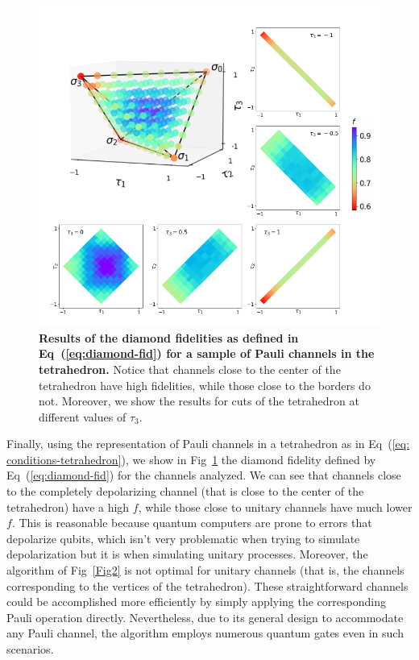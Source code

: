 \documentclass[10pt,letterpaper]{article} %
\newcommand{\fref}[1]{Fig~\ref{#1}}
\newcommand{\eref}[1]{Eq~(\ref{#1})}
\begin{document}
\begin{figure} %
\centering
\includegraphics{images/fig-tetra.pdf}
\caption{{\bf Results of the diamond fidelities as defined in \eref{eq:diamond-fid}
for a sample of Pauli channels in the tetrahedron.}  Notice that channels close
to the center of the tetrahedron have high fidelities, while those close to the
borders do not.  Moreover, we show the results for cuts of the tetrahedron at
different values of $\tau_3$.}
\label{Fig3}
\end{figure} %

Finally, using the representation of Pauli channels in a tetrahedron as in
\eref{eq: conditions-tetrahedron}, we show in \fref{Fig3} the diamond
fidelity defined by \eref{eq:diamond-fid} for the channels analyzed.  We can
see that channels close to the completely depolarizing channel (that is close
to the center of the tetrahedron) have a high $f$, while those close to unitary
channels have much lower $f$.  This is reasonable because quantum computers are
prone to errors that depolarize qubits, which isn't very problematic when
trying to simulate depolarization but it is when simulating unitary processes.
Moreover, the algorithm of \fref{Fig2} is not optimal for
unitary channels (that is, the channels corresponding to the vertices of the
tetrahedron).  These straightforward channels could be accomplished more
efficiently by simply applying the corresponding Pauli operation directly.
Nevertheless, due to its general design to accommodate any Pauli channel, the
algorithm employs numerous quantum gates even in such scenarios.
\end{document}
